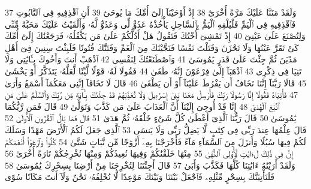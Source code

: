 {\tiny\colorbox{cl_aya}{37}} وَلَقَدْ مَنَنَّا عَلَيْكَ مَرَّةً أُخْرَىٰٓ
{\tiny\colorbox{cl_aya}{38}} إِذْ أَوْحَيْنَآ إِلَىٰٓ أُمِّكَ مَا يُوحَىٰٓ
{\tiny\colorbox{cl_aya}{39}} أَنِ ٱقْذِفِيهِ فِى ٱلتَّابُوتِ فَٱقْذِفِيهِ فِى ٱلْيَمِّ فَلْيُلْقِهِ ٱلْيَمُّ بِٱلسَّاحِلِ يَأْخُذْهُ عَدُوٌّ لِّى وَعَدُوٌّ لَّهُۥ وَأَلْقَيْتُ عَلَيْكَ مَحَبَّةً مِّنِّى وَلِتُصْنَعَ عَلَىٰ عَيْنِىٓ
{\tiny\colorbox{cl_aya}{40}} إِذْ تَمْشِىٓ أُخْتُكَ فَتَقُولُ هَلْ أَدُلُّكُمْ عَلَىٰ مَن يَكْفُلُهُۥ فَرَجَعْنَٰكَ إِلَىٰٓ أُمِّكَ كَىْ تَقَرَّ عَيْنُهَا وَلَا تَحْزَنَ وَقَتَلْتَ نَفْسًا فَنَجَّيْنَٰكَ مِنَ ٱلْغَمِّ وَفَتَنَّٰكَ فُتُونًا فَلَبِثْتَ سِنِينَ فِىٓ أَهْلِ مَدْيَنَ ثُمَّ جِئْتَ عَلَىٰ قَدَرٍ يَٰمُوسَىٰ
{\tiny\colorbox{cl_aya}{41}} وَٱصْطَنَعْتُكَ لِنَفْسِى
{\tiny\colorbox{cl_aya}{42}} ٱذْهَبْ أَنتَ وَأَخُوكَ بِـَٔايَٰتِى وَلَا تَنِيَا فِى ذِكْرِى
{\tiny\colorbox{cl_aya}{43}} ٱذْهَبَآ إِلَىٰ فِرْعَوْنَ إِنَّهُۥ طَغَىٰ
{\tiny\colorbox{cl_aya}{44}} فَقُولَا لَهُۥ قَوْلًا لَّيِّنًا لَّعَلَّهُۥ يَتَذَكَّرُ أَوْ يَخْشَىٰ
{\tiny\colorbox{cl_aya}{45}} قَالَا رَبَّنَآ إِنَّنَا نَخَافُ أَن يَفْرُطَ عَلَيْنَآ أَوْ أَن يَطْغَىٰ
{\tiny\colorbox{cl_aya}{46}} قَالَ لَا تَخَافَآ إِنَّنِى مَعَكُمَآ أَسْمَعُ وَأَرَىٰ
{\tiny\colorbox{cl_aya}{47}} فَأْتِيَاهُ فَقُولَآ إِنَّا رَسُولَا رَبِّكَ فَأَرْسِلْ مَعَنَا بَنِىٓ إِسْرَٰٓءِيلَ وَلَا تُعَذِّبْهُمْ قَدْ جِئْنَٰكَ بِـَٔايَةٍ مِّن رَّبِّكَ وَٱلسَّلَٰمُ عَلَىٰ مَنِ ٱتَّبَعَ ٱلْهُدَىٰٓ
{\tiny\colorbox{cl_aya}{48}} إِنَّا قَدْ أُوحِىَ إِلَيْنَآ أَنَّ ٱلْعَذَابَ عَلَىٰ مَن كَذَّبَ وَتَوَلَّىٰ
{\tiny\colorbox{cl_aya}{49}} قَالَ فَمَن رَّبُّكُمَا يَٰمُوسَىٰ
{\tiny\colorbox{cl_aya}{50}} قَالَ رَبُّنَا ٱلَّذِىٓ أَعْطَىٰ كُلَّ شَىْءٍ خَلْقَهُۥ ثُمَّ هَدَىٰ
{\tiny\colorbox{cl_aya}{51}} قَالَ فَمَا بَالُ ٱلْقُرُونِ ٱلْأُولَىٰ
{\tiny\colorbox{cl_aya}{52}} قَالَ عِلْمُهَا عِندَ رَبِّى فِى كِتَٰبٍ لَّا يَضِلُّ رَبِّى وَلَا يَنسَى
{\tiny\colorbox{cl_aya}{53}} ٱلَّذِى جَعَلَ لَكُمُ ٱلْأَرْضَ مَهْدًا وَسَلَكَ لَكُمْ فِيهَا سُبُلًا وَأَنزَلَ مِنَ ٱلسَّمَآءِ مَآءً فَأَخْرَجْنَا بِهِۦٓ أَزْوَٰجًا مِّن نَّبَاتٍ شَتَّىٰ
{\tiny\colorbox{cl_aya}{54}} كُلُوا۟ وَٱرْعَوْا۟ أَنْعَٰمَكُمْ إِنَّ فِى ذَٰلِكَ لَءَايَٰتٍ لِّأُو۟لِى ٱلنُّهَىٰ
{\tiny\colorbox{cl_aya}{55}} مِنْهَا خَلَقْنَٰكُمْ وَفِيهَا نُعِيدُكُمْ وَمِنْهَا نُخْرِجُكُمْ تَارَةً أُخْرَىٰ
{\tiny\colorbox{cl_aya}{56}} وَلَقَدْ أَرَيْنَٰهُ ءَايَٰتِنَا كُلَّهَا فَكَذَّبَ وَأَبَىٰ
{\tiny\colorbox{cl_aya}{57}} قَالَ أَجِئْتَنَا لِتُخْرِجَنَا مِنْ أَرْضِنَا بِسِحْرِكَ يَٰمُوسَىٰ
{\tiny\colorbox{cl_aya}{58}} فَلَنَأْتِيَنَّكَ بِسِحْرٍ مِّثْلِهِۦ فَٱجْعَلْ بَيْنَنَا وَبَيْنَكَ مَوْعِدًا لَّا نُخْلِفُهُۥ نَحْنُ وَلَآ أَنتَ مَكَانًا سُوًى
